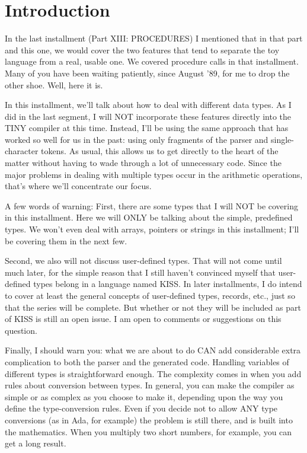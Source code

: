 \documentclass[float=false, crop=false]{standalone}
\begin{document}
\section{Introduction}

In the last installment (Part XIII: PROCEDURES) I mentioned that in that part
and this one, we would cover the two features that tend to separate the toy
language from a real, usable one. We covered procedure calls in that
installment. Many of you have been waiting patiently, since August '89, for me
to drop the other shoe. Well, here it is.

In this installment, we'll talk about how to deal with different data types. As
I did in the last segment, I will NOT incorporate these features directly into
the TINY compiler at this time. Instead, I'll be using the same approach that
has worked so well for us in the past: using only fragments of the parser and
single-character tokens. As usual, this allows us to get directly to the heart
of the matter without having to wade through a lot of unnecessary code. Since
the major problems in dealing with multiple types occur in the arithmetic
operations, that's where we'll concentrate our focus.

A few words of warning: First, there are some types that I will NOT be covering
in this installment. Here we will ONLY be talking about the simple, predefined
types. We won't even deal with arrays, pointers or strings in this installment;
I'll be covering them in the next few.

Second, we also will not discuss user-defined types. That will not come until
much later, for the simple reason that I still haven't convinced myself that
user-defined types belong in a language named KISS. In later installments, I do
intend to cover at least the general concepts of user-defined types, records,
etc., just so that the series will be complete. But whether or not they will be
included as part of KISS is still an open issue. I am open to comments or
suggestions on this question.

Finally, I should warn you: what we are about to do CAN add considerable extra
complication to both the parser and the generated code. Handling variables of
different types is straightforward enough. The complexity comes in when you add
rules about conversion between types. In general, you can make the compiler as
simple or as complex as you choose to make it, depending upon the way you define
the type-conversion rules. Even if you decide not to allow ANY type conversions
(as in Ada, for example) the problem is still there, and is built into the
mathematics. When you multiply two short numbers, for example, you can get a
long result.
\end{document}

